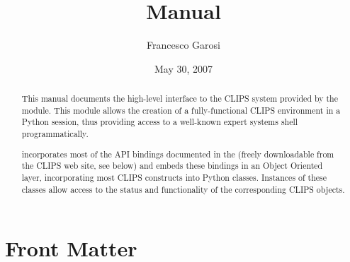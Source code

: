 \documentclass{manual}
\title{\pyclips{} Manual}
\author{Francesco Garosi}
\date{May 30, 2007}
\begin{document}
\maketitle

\ifhtml
\chapter*{Front Matter\label{front}}
\fi



\begin{abstract}

\noindent
This manual documents the high-level interface to the CLIPS system
provided by the \pyclips{} module. This module allows the creation of a
fully-functional CLIPS environment in a Python session, thus providing
access to a well-known expert systems shell programmatically.

\pyclips{} incorporates most of the API bindings documented in the
\clipsapg{} (freely downloadable from the CLIPS web site, see below) and
embeds these bindings in an Object Oriented layer, incorporating most
CLIPS constructs into Python classes. Instances of these classes allow
access to the status and functionality of the corresponding CLIPS objects.

\end{abstract}


\begin{seealso}
\end{seealso}

\tableofcontents


\end{document}
